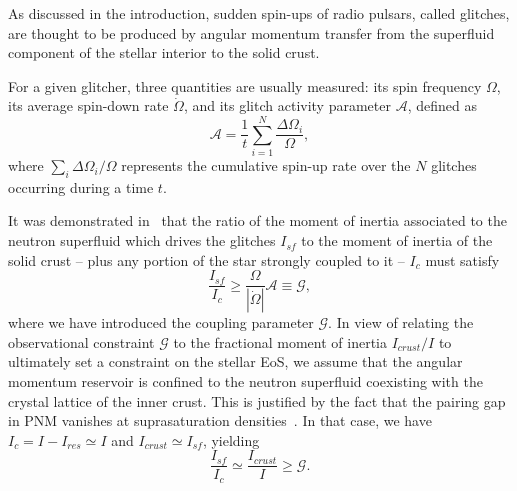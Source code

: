 
As discussed in the introduction, sudden spin-ups of radio pulsars, called 
glitches, are thought to be produced by angular momentum transfer from the
superfluid component of the stellar interior to the solid crust.

For a given glitcher, three quantities are usually measured: its spin frequency 
$\Omega$, its average spin-down rate $\dot{\Omega}$, and its glitch activity 
parameter $\mathcal{A}$, defined as
%
\begin{equation}
  \mathcal{A} = \frac{1}{t}\sum_{i=1}^{N} \frac{\Delta \Omega_i}{\Omega},
\end{equation}
%
where $\sum_i \Delta\Omega_i/\Omega$ represents the cumulative spin-up rate
over the $N$ glitches occurring during a time $t$.

It was demonstrated in~\cite{Link1999} that the ratio of the moment of inertia
associated to the neutron superfluid which drives the glitches $I_{sf}$ to the 
moment of inertia of the solid crust -- plus any portion of the star strongly 
coupled to it -- $I_c$ must satisfy 
%
\begin{equation}
  \frac{I_{sf}}{I_c} \geq \frac{\Omega}{|\dot{\Omega}|}\mathcal{A} 
  \equiv \mathcal{G},
\end{equation}
%
where we have introduced the coupling parameter $\mathcal{G}$. In view of
relating the observational constraint $\mathcal{G}$ to the fractional moment of
inertia $I_{crust}/I$ to ultimately set a constraint on the stellar EoS, we 
assume that the angular momentum reservoir is confined to the neutron 
superfluid coexisting with the crystal lattice of the inner crust. 
%
{This is justified by the fact that the pairing gap in PNM vanishes at
suprasaturation densities~\cite{Cao2006}.}
%
In that case, we have $I_c = I - I_{res} \simeq I$ and 
$I_{crust} \simeq I_{sf}$, yielding~\cite{Link1999}
%
\begin{equation}
  \frac{I_{sf}}{I_c} \simeq \frac{I_{crust}}{I} 
  \geq \mathcal{G}\label{eq:noent}.
\end{equation}
%

